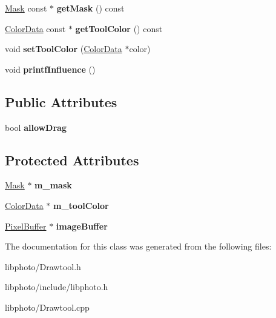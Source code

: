 \begin{DoxyCompactItemize}
\item 
\hypertarget{classDrawTool_abe686697d432374ec0f27323da6e4892}{\hyperlink{classMask}{Mask} const $\ast$ {\bfseries get\-Mask} () const }\label{classDrawTool_abe686697d432374ec0f27323da6e4892}

\item 
\hypertarget{classDrawTool_ac19eb962a24f0bd60b0854079424c7ec}{\hyperlink{classColorData}{Color\-Data} const $\ast$ {\bfseries get\-Tool\-Color} () const }\label{classDrawTool_ac19eb962a24f0bd60b0854079424c7ec}

\item 
\hypertarget{classDrawTool_a7f7097be5f6beb7b3f6ce437785cac7a}{void {\bfseries set\-Tool\-Color} (\hyperlink{classColorData}{Color\-Data} $\ast$color)}\label{classDrawTool_a7f7097be5f6beb7b3f6ce437785cac7a}

\item 
\hypertarget{classDrawTool_a04f57381cb6c71d90a66e905b46f424c}{void {\bfseries printf\-Influence} ()}\label{classDrawTool_a04f57381cb6c71d90a66e905b46f424c}

\end{DoxyCompactItemize}
\subsection*{Public Attributes}
\begin{DoxyCompactItemize}
\item 
\hypertarget{classDrawTool_a87f991a7c84a4c5ad60ebbfd813a3ab2}{bool {\bfseries allow\-Drag}}\label{classDrawTool_a87f991a7c84a4c5ad60ebbfd813a3ab2}

\end{DoxyCompactItemize}
\subsection*{Protected Attributes}
\begin{DoxyCompactItemize}
\item 
\hypertarget{classDrawTool_aec05f24cbbac4aebd0b75d1671372a04}{\hyperlink{classMask}{Mask} $\ast$ {\bfseries m\-\_\-mask}}\label{classDrawTool_aec05f24cbbac4aebd0b75d1671372a04}

\item 
\hypertarget{classDrawTool_a8de7922639301ea6b2576dcb2ed9ab10}{\hyperlink{classColorData}{Color\-Data} $\ast$ {\bfseries m\-\_\-tool\-Color}}\label{classDrawTool_a8de7922639301ea6b2576dcb2ed9ab10}

\item 
\hypertarget{classDrawTool_a6e9ffceeac84ab40f1d33c08675ee6d1}{\hyperlink{classPixelBuffer}{Pixel\-Buffer} $\ast$ {\bfseries image\-Buffer}}\label{classDrawTool_a6e9ffceeac84ab40f1d33c08675ee6d1}

\end{DoxyCompactItemize}


The documentation for this class was generated from the following files\-:\begin{DoxyCompactItemize}
\item 
libphoto/Drawtool.\-h\item 
libphoto/include/libphoto.\-h\item 
libphoto/Drawtool.\-cpp\end{DoxyCompactItemize}
